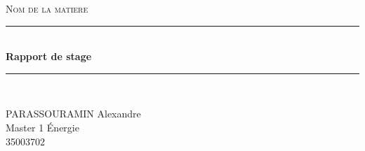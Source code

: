 \documentclass[12pt,a4paper]{article}
\begin{document}
\begin{titlepage}
\begin{minipage}[c]{.46\linewidth}
     \begin{center}
         
         \end{center}
   \end{minipage} \hfill
   \begin{minipage}[c]{.46\linewidth}
    \begin{center}
        \end{center}
 \end{minipage}
\newcommand{\HRule}{\rule{\linewidth}{0.5mm}}
\center
\textsc{\LARGE
Nom de la matiere
} \\[4cm]

\HRule \\[0.4cm]
{ \huge \bfseries Rapport de stage\\ [0.15cm] }
\HRule \\[15cm]


\begin{flushleft}
PARASSOURAMIN Alexandre\\
Master 1 Énergie \\
35003702
\end{flushleft}


\end{titlepage}
\newpage
\thispagestyle{empty}
~


\newpage







\thispagestyle{empty}
\renewcommand{\contentsname}{Sommaire}
\tableofcontents
\newpage

\newpage
\thispagestyle{empty}
~
\newpage
\end{document}
